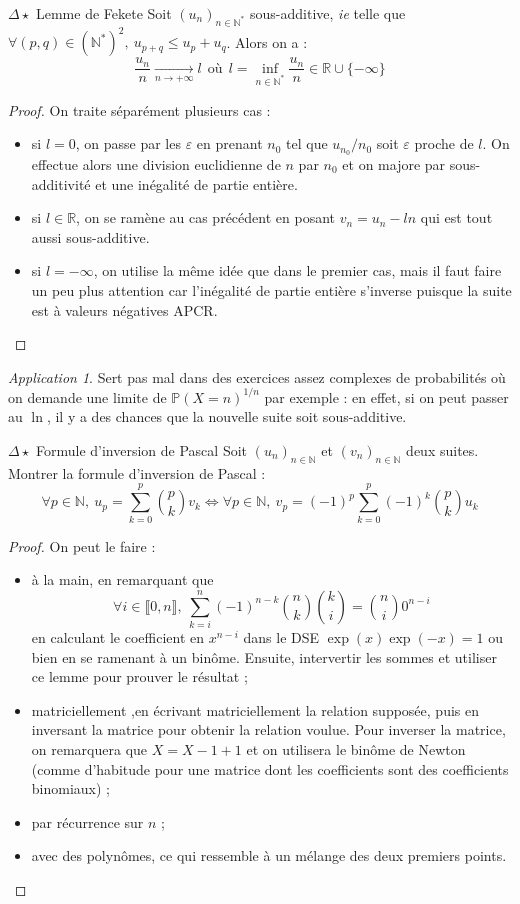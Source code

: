 \documentclass[french,a4paper]{article}
\renewcommand{\P}{\mathbb{P}}
\newcommand{\N}{\mathbb{N}}
\newcommand{\R}{\mathbb{R}}
\newcommand{\st}{^*}
\theoremstyle{plain}
\theoremstyle{definition}
\theoremstyle{remark}
\newtheorem*{app}{Application}
\begin{document}
\begin{ex}{$\Delta\star$ Lemme de Fekete}
	Soit $(u_n)_{n\in\N\st}$ sous-additive, \textit{ie} telle que $\forall(p,q)\in(\N\st)^2,\ u_{p+q}\leqslant u_p+u_q$. Alors on a : $$\frac{u_n}{n}\xrightarrow[n\to+\infty]{}l \ \ \text{où} \ \ l=\inf_{n\in\N\st}\frac{u_n}{n}\in\R\cup\{-\infty\}$$
\end{ex}
\begin{proof}
	On traite séparément plusieurs cas :
	\begin{itemize}
		\item si $l=0$, on passe par les $\varepsilon$ en prenant $n_0$ tel que $u_{n_0}/n_0$ soit $\varepsilon$ proche de $l$. On effectue alors une division euclidienne de $n$ par $n_0$ et on majore par sous-additivité et une inégalité de partie entière.
		\item si $l\in\R$, on se ramène au cas précédent en posant $v_n=u_n-ln$ qui est tout aussi sous-additive.
		\item si $l=-\infty$, on utilise la même idée que dans le premier cas, mais il faut faire un peu plus attention car l'inégalité de partie entière s'inverse puisque la suite est à valeurs négatives APCR.
	\end{itemize}
\end{proof}
\begin{app}
	Sert pas mal dans des exercices assez complexes de probabilités où on demande une limite de $\P(X=n)^{1/n}$ par exemple : en effet, si on peut passer au $\ln$, il y a des chances que la nouvelle suite soit sous-additive.
\end{app}

\begin{ex}{$\Delta\star$ Formule d'inversion de Pascal}
	Soit $(u_n)_{n\in\N}$ et $(v_n)_{n\in\N}$ deux suites. Montrer la formule d'inversion de Pascal : $$\forall p\in\N,\ u_p=\sum_{k=0}^{p}\binom{p}{k}v_k \iff \forall p\in\N,\ v_p=(-1)^p\sum_{k=0}^{p}(-1)^k\binom{p}{k}u_k$$
\end{ex}
\begin{proof}
	On peut le faire :
	\begin{itemize}
		\item à la main, en remarquant que $$\forall i\in\llbracket0,n\rrbracket,\ \sum_{k=i}^{n}(-1)^{n-k}\binom{n}{k}\binom{k}{i}=\binom{n}{i}0^{n-i}$$ en calculant le coefficient en $x^{n-i}$ dans le DSE $\exp(x)\exp(-x)=1$ ou bien en se ramenant à un binôme. Ensuite, intervertir les sommes et utiliser ce lemme pour prouver le résultat ;
		\item matriciellement ,en écrivant matriciellement la relation supposée, puis en inversant la matrice pour obtenir la relation voulue. Pour inverser la matrice, on remarquera que $X=X-1+1$ et on utilisera le binôme de Newton (comme d'habitude pour une matrice dont les coefficients sont des coefficients binomiaux) ;
		\item par récurrence sur $n$ ;
		\item avec des polynômes, ce qui ressemble à un mélange des deux premiers points.
	\end{itemize}
\end{proof}
\end{document}
